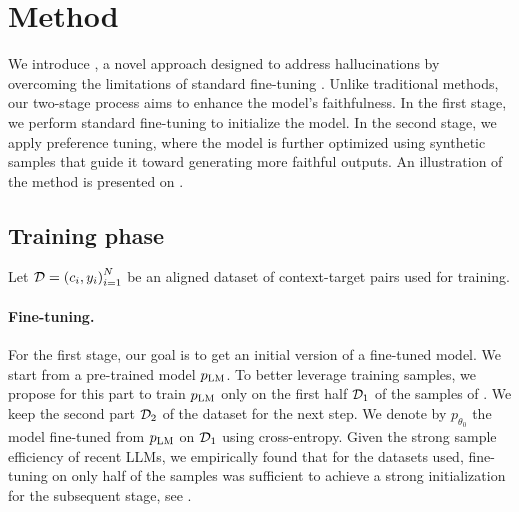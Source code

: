 \section{Method}


We introduce \scope, a novel approach designed to address hallucinations by overcoming the limitations of standard fine-tuning \citep{faithfulness-summarization,cao-wang-2021-cliff}. Unlike traditional methods, our two-stage process aims to enhance the model's faithfulness. In the first stage, we perform standard fine-tuning to initialize the model. In the second stage, we apply preference tuning, where the model is further optimized using synthetic samples that guide it toward generating more faithful outputs. An illustration of the method is presented on .

\subsection{Training phase}
Let $\mathcal{D} = {(c_i, y_i)}_{i=1}^N$ be an aligned dataset of context-target pairs used for training.
\paragraph{Fine-tuning.} For the first stage, our goal is to get an initial version of a fine-tuned model. We start from a pre-trained model $p_{\text{LM}}$. To better leverage training samples, we propose for this part to train $p_{\text{LM}}$ only on the first half $\mathcal{D}_1$ of the samples of \dataset. We keep the second part $\mathcal{D}_2$ of the dataset for the next step. %
We denote by $p_{\theta_0}$ the model fine-tuned from $p_{\text{LM}}$ on $\mathcal{D}_1$ using cross-entropy. Given the strong sample efficiency of recent LLMs, we empirically found that for the datasets used, fine-tuning on only half of the samples was sufficient to achieve a strong initialization for the subsequent stage, see .


